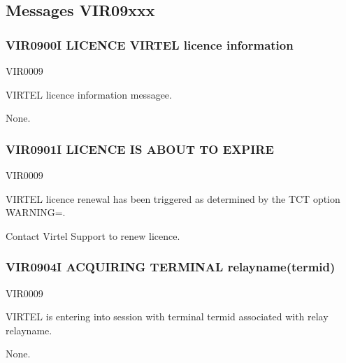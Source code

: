 \documentclass[letterpaper,10pt,english]{sphinxmanual}
\begin{document}
\subsection{Messages VIR09xxx}
\label{\detokenize{messages:messages-vir09xxx}}

\subsubsection{VIR0900I LICENCE VIRTEL licence information}
\label{\detokenize{messages:vir0900i-licence-virtel-licence-information}}\begin{description}
\sphinxAtStartPar
VIR0009

\sphinxAtStartPar
VIRTEL licence information messagee.

\sphinxAtStartPar
None.

\end{description}


\subsubsection{VIR0901I LICENCE IS ABOUT TO EXPIRE}
\label{\detokenize{messages:vir0901i-licence-is-about-to-expire}}\begin{description}
\sphinxAtStartPar
VIR0009

\sphinxAtStartPar
VIRTEL licence renewal has been triggered as determined by the TCT option WARNING=.

\sphinxAtStartPar
Contact Virtel Support to renew licence.

\end{description}


\subsubsection{VIR0904I ACQUIRING TERMINAL relayname(termid)}
\label{\detokenize{messages:vir0904i-acquiring-terminal-relayname-termid}}\begin{description}
\sphinxAtStartPar
VIR0009

\sphinxAtStartPar
VIRTEL is entering into session with terminal termid associated with relay relayname.

\sphinxAtStartPar
None.

\end{description}
\end{document}
